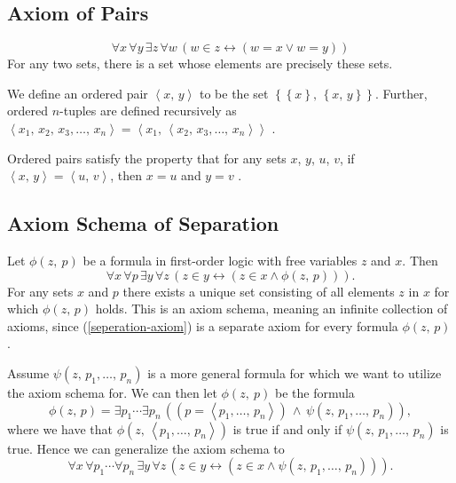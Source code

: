 \documentclass[../../main.tex]{subfiles}
\begin{document}
\subsection{Axiom of Pairs}\label{ZF2}
$$\forall x\, \forall y\, \exists z\, \forall w\, \left( w \in z \leftrightarrow \left(w = x \vee w = y \right)\right)$$
For any two sets, there is a set whose elements are precisely these sets.
 
We define an ordered pair $\left<x,\, y\right>$ to be the set $\left\{\left\{x\right\},\, \left\{x,\, y\right\}\right\}$.
Further, ordered $n$-tuples are defined recursively as $\left<x_1,\, x_2,\, x_3,\ldots,\, x_n\right> = \left<x_1,\, \left<x_2,\, x_3,\ldots,\, x_n\right>\right>$ \cite[\S 4.3, pp.76, 79-80]{Gol17}.

Ordered pairs satisfy the property that for any sets $x$, $y$, $u$, $v$, if $\left<x,\, y\right> = \left<u,\, v\right>$, then $x = u$ and $y = v$ \cite[Theorem 4.2]{Gol17}.

\subsection{Axiom Schema of Separation}\label{ZF3}
Let $\phi(z,\ p)$ be a formula in first-order logic with free variables $z$ and $x$. Then
\begin{equation}\label{seperation-axiom}
    \forall x\, \forall p\, \exists y\, \forall z\, \left(z \in y \leftrightarrow \left(z \in x \wedge \phi(z,\, p)\right)\right).
\end{equation}
For any sets $x$ and $p$ there exists a unique set consisting of all elements $z$ in $x$ for which $\phi(z,\, p)$ holds.
This is an axiom schema, meaning an infinite collection of axioms, since (\ref{seperation-axiom}) is a separate axiom for every formula $\phi(z,\, p)$.

Assume $\psi(z,\, p_1,\ldots,\, p_n)$ is a more general formula for which we want to utilize the axiom schema for.
We can then let $\phi(z,\ p)$ be the formula
$$\phi(z,\, p) = \exists p_1 \cdots \exists p_n\, \left(\left(p = \left<p_1,\ldots,\, p_n\right>\right) \, \wedge \, \psi(z,\, p_1,\ldots,\, p_n)\right),$$
where we have that $\phi(z,\, \left<p_1,\ldots,\, p_n\right>)$ is true if and only if $\psi(z,\, p_1,\ldots,\, p_n)$ is true.
Hence we can generalize the axiom schema to 
\begin{equation}\label{general-seperation-axiom}
    \forall x\, \forall p_1 \cdots \forall p_n\, \exists y\, \forall z\, \left(z \in y \leftrightarrow \left(z \in x \wedge \psi(z,\, p_1,\ldots,\, p_n)\right)\right).
\end{equation}
\end{document}
